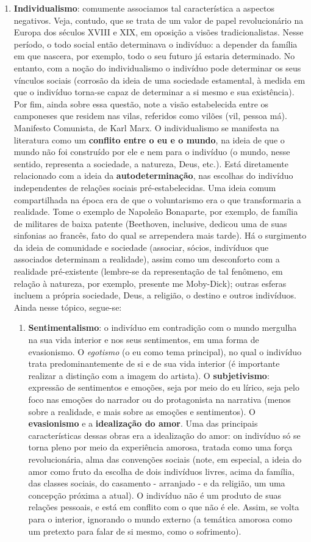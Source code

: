 \begin{enumerate}
\item \textbf{Individualismo}: comumente associamos tal característica a aspectos negativos. Veja, contudo, que se trata de um valor de papel revolucionário na Europa dos séculos XVIII e XIX, em oposição a visões tradicionalistas. Nesse período, o todo social então determinava o indivíduo: a depender da família em que nascera, por exemplo, todo o seu futuro já estaria determinado. No entanto, com a noção do individualismo o indivíduo pode determinar os seus vínculos sociais (corrosão da ideia de uma sociedade estamental, à medida em que o indivíduo torna-se capaz de determinar a si mesmo e sua existência). Por fim, ainda sobre essa questão, note a visão estabelecida entre os camponeses que residem nas vilas, referidos como vilões (vil, pessoa má). Manifesto Comunista, de Karl Marx. O individualismo se manifesta na literatura como um \textbf{conflito entre o eu e o mundo}, na ideia de que o mundo não foi construído por ele e nem para o indivíduo (o mundo, nesse sentido, representa a sociedade, a natureza, Deus, etc.). Está diretamente relacionado com a ideia da \textbf{autodeterminação}, nas escolhas do indivíduo independentes de relações sociais pré-estabelecidas. Uma ideia comum compartilhada na época era de que o voluntarismo era o que transformaria a realidade. Tome o exemplo de Napoleão Bonaparte, por exemplo, de família de militares de baixa patente (Beethoven, inclusive, dedicou uma de suas sinfonias ao francês, fato do qual se arrependera mais tarde). Há o surgimento da ideia de comunidade e sociedade (associar, sócios, indivíduos que associados determinam a realidade), assim como um desconforto com a realidade pré-existente (lembre-se da representação de tal fenômeno, em relação à natureza, por exemplo, presente me Moby-Dick); outras esferas incluem a própria sociedade, Deus, a religião, o destino e outros indivíduos. Ainda nesse tópico, segue-se:
\begin{enumerate}
\item \textbf{Sentimentalismo}: o indivíduo em contradição com o mundo mergulha na sua vida interior e nos seus sentimentos, em uma forma de evasionismo. O \textit{egotismo} (o eu como tema principal), no qual o indivíduo trata predominantemente de si e de sua vida interior (é importante realizar a distinção com a imagem do artista). O \textbf{subjetivismo}: expressão de sentimentos e emoções, seja por meio do eu lírico, seja pelo foco nas emoções do narrador ou do protagonista na narrativa (menos sobre a realidade, e mais sobre as emoções e sentimentos). O \textbf{evasionismo} e a \textbf{idealização do amor}. Uma das principais características dessas obras era a idealização do amor: on indivíduo só se torna pleno por meio da experiência amorosa, tratada como uma força revolucionária, alma das convenções sociais (note, em especial, a ideia do amor como fruto da escolha de dois indivíduos livres, acima da família, das classes sociais, do casamento - arranjado - e da religião, um uma concepção próxima a atual). O indivíduo não é um produto de suas relações pessoais, e está em conflito com o que não é ele. Assim, se volta para o interior, ignorando o mundo externo (a temática amorosa como um pretexto para falar de si mesmo, como o sofrimento).

\end{enumerate}
\end{enumerate}
